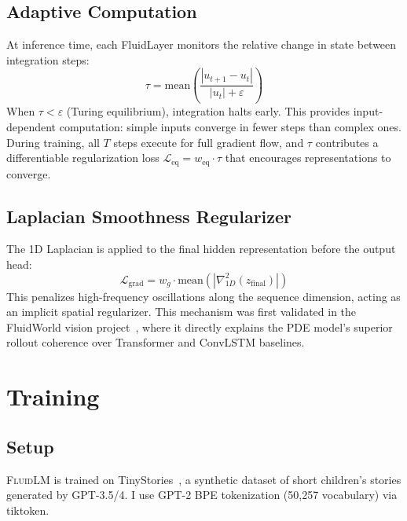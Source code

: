 \documentclass{article}
\newcommand{\fluidlm}{\textsc{FluidLM}}
\begin{document}
\subsection{Adaptive Computation}

At inference time, each FluidLayer monitors the relative change in state between integration steps:
\begin{equation}
\tau = \text{mean}\!\left(\frac{|u_{t+1} - u_t|}{|u_t| + \varepsilon}\right)
\end{equation}
When $\tau < \varepsilon$ (Turing equilibrium), integration halts early. This provides input-dependent computation: simple inputs converge in fewer steps than complex ones. During training, all $T$ steps execute for full gradient flow, and $\tau$ contributes a differentiable regularization loss $\mathcal{L}_{\text{eq}} = w_{\text{eq}} \cdot \tau$ that encourages representations to converge.

\subsection{Laplacian Smoothness Regularizer}

The 1D Laplacian is applied to the final hidden representation before the output head:
\begin{equation}
\mathcal{L}_{\text{grad}} = w_g \cdot \text{mean}\!\left(|\nabla^2_{1D}(z_{\text{final}})|\right)
\end{equation}
This penalizes high-frequency oscillations along the sequence dimension, acting as an implicit spatial regularizer. This mechanism was first validated in the FluidWorld vision project~\cite{polly2026fluidworld}, where it directly explains the PDE model's superior rollout coherence over Transformer and ConvLSTM baselines.

\section{Training}
\label{sec:training}

\subsection{Setup}

\fluidlm{} is trained on TinyStories~\cite{eldan2023tinystories}, a synthetic dataset of short children's stories generated by GPT-3.5/4. I use GPT-2 BPE tokenization (50,257 vocabulary) via tiktoken.
\end{document}
